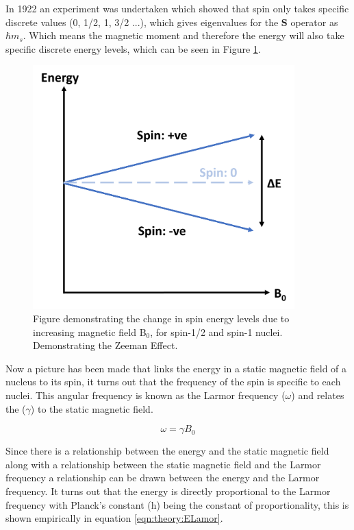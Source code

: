 \documentclass[class=article, crop=false]{standalone}
\begin{document}
In 1922 an experiment was undertaken\cite{Gerlach1922DerMagnetfeld} which showed that spin only takes specific discrete values (0, 1/2, 1, 3/2 ...), which gives eigenvalues for the $\mathbf{S}$ operator as $\hbar m_s$. Which means the magnetic moment and therefore the energy will also take specific discrete energy levels, which can be seen in Figure \ref{fig:theory:zeeman}.

\begin{figure}
    \centering
    \includegraphics[width=0.9\textwidth]{Figures/Theory/Zeeman.png}
    \caption{Figure demonstrating the change in spin energy levels due to increasing magnetic field B$_0$, for spin-1/2 and spin-1 nuclei. Demonstrating the Zeeman Effect\cite{Zeeman1896VerslagenAfdeeling}.}
    \label{fig:theory:zeeman}
\end{figure}

Now a picture has been made that links the energy in a static magnetic field of a nucleus to its spin, it turns out that the frequency of the spin is specific to each nuclei. This angular frequency is known as the Larmor frequency\cite{Larmor1897LXIII.Ions} ($\omega$) and relates the ($\gamma$) to the static magnetic field.

\begin{equation}
    \omega = \gamma B_0
    \label{eqn:theory:Lamor}
\end{equation}

Since there is a relationship between the energy and the static magnetic field along with a relationship between the static magnetic field and the Larmor frequency a relationship can be drawn between the energy and the Larmor frequency. It turns out that the energy is directly proportional to the Larmor frequency with Planck's constant (h) being the constant of proportionality, this is shown empirically in equation \ref{eqn:theory:ELamor}.
\end{document}
